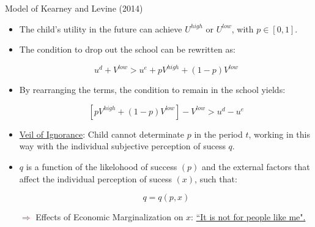 \documentclass{beamer}
\begin{document}
\begin{frame}{Model of Kearney and Levine (2014)}
\begin{itemize}
\item \footnotesize The child's utility in the future can achieve $U^{high}$ or $U^{low}$, with  $p \in [0,1]$.
\item \footnotesize The condition to drop out the school can be rewritten as:

\begin{equation} \label{eq:Condition2} 
u^d + V^{low} > u^e + pV^{high} + (1-p)V^{low}
\end{equation}

\item \footnotesize By rearranging the terms, the condition to remain in the school yields:


\begin{equation} \label{eq:Condition3} 
\left[pV^{high} + (1-p)V^{low} \right] - V^{low} > u^d - u^e  
\end{equation}

\item \footnotesize \underline{Veil of Ignorance}: Child cannot determinate $p$ in the period $t$, working in this way with the individual subjective perception of sucess $q$.
\item \footnotesize $q$ is a function of the likelohood of success $(p)$ and the external factors that affect the individual perception of sucess $(x)$, such that:

\begin{equation}
q=q(p,x)
\end{equation}

\textcolor{red}{$\Longrightarrow$} Effects of Economic Marginalization on $x$: \underline{``It is not for people like me".}
\end{itemize}
\end{frame}
\end{document}
